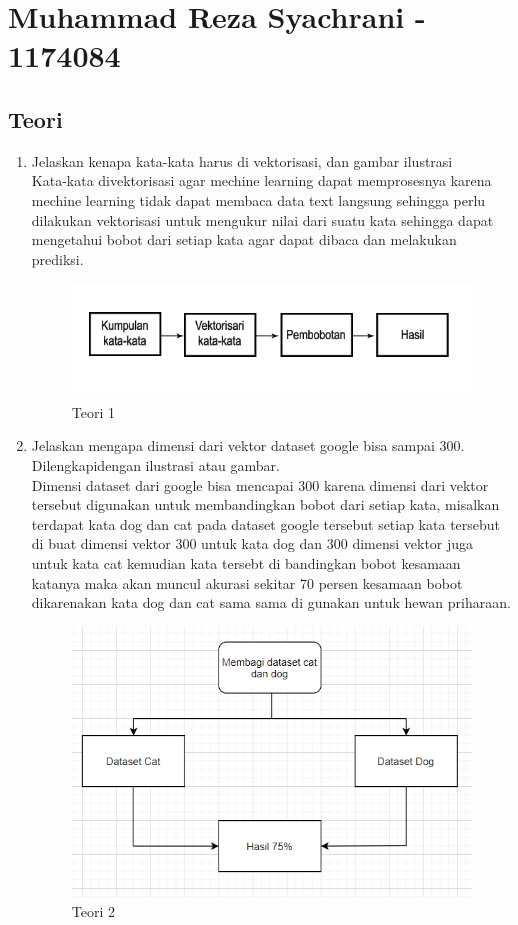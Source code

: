 \section{Muhammad Reza Syachrani - 1174084}
\subsection{Teori}
\begin{enumerate}

	\item Jelaskan kenapa kata-kata harus di vektorisasi, dan gambar ilustrasi
	\hfill\\
Kata-kata divektorisasi agar mechine learning dapat memprosesnya karena mechine learning tidak dapat membaca data text langsung sehingga perlu dilakukan vektorisasi untuk mengukur nilai dari suatu kata sehingga dapat mengetahui bobot dari setiap kata agar dapat dibaca dan melakukan prediksi.
\begin{figure}[H]
    \includegraphics[width=12cm]{figures/1174084/5/teori1.png}
    \centering
    \caption{Teori 1}
\end{figure}

\item Jelaskan mengapa dimensi dari vektor dataset google bisa sampai 300. Dilengkapidengan ilustrasi atau gambar.
	\hfill\\
	Dimensi dataset dari google bisa mencapai 300 karena dimensi dari vektor tersebut digunakan untuk membandingkan bobot dari setiap kata, misalkan terdapat kata dog dan cat pada dataset google tersebut setiap kata tersebut di buat dimensi vektor 300 untuk kata dog dan 300 dimensi vektor juga untuk kata cat kemudian kata tersebt di bandingkan bobot kesamaan katanya maka akan muncul akurasi sekitar 70 persen kesamaan bobot dikarenakan kata dog dan cat sama sama di gunakan untuk hewan priharaan.

\begin{figure}[H]
    \includegraphics[width=12cm]{figures/1174084/5/teori2.png}
    \centering
    \caption{Teori 2}
\end{figure}


\end{enumerate}

